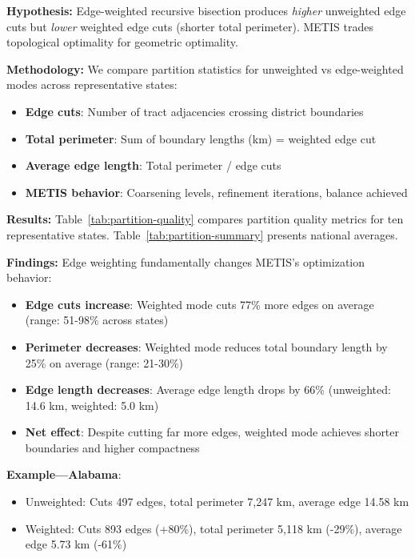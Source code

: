 \textbf{Hypothesis:} Edge-weighted recursive bisection produces \textit{higher} unweighted edge cuts but \textit{lower} weighted edge cuts (shorter total perimeter). METIS trades topological optimality for geometric optimality.

\textbf{Methodology:} We compare partition statistics for unweighted vs edge-weighted modes across representative states:
\begin{itemize}
    \item \textbf{Edge cuts}: Number of tract adjacencies crossing district boundaries
    \item \textbf{Total perimeter}: Sum of boundary lengths (km) = weighted edge cut
    \item \textbf{Average edge length}: Total perimeter / edge cuts
    \item \textbf{METIS behavior}: Coarsening levels, refinement iterations, balance achieved
\end{itemize}

\textbf{Results:} Table~\ref{tab:partition-quality} compares partition quality metrics for ten representative states. Table~\ref{tab:partition-summary} presents national averages.




\textbf{Findings:} Edge weighting fundamentally changes METIS's optimization behavior:
\begin{itemize}
    \item \textbf{Edge cuts increase}: Weighted mode cuts 77\% more edges on average (range: 51-98\% across states)
    \item \textbf{Perimeter decreases}: Weighted mode reduces total boundary length by 25\% on average (range: 21-30\%)
    \item \textbf{Edge length decreases}: Average edge length drops by 66\% (unweighted: 14.6 km, weighted: 5.0 km)
    \item \textbf{Net effect}: Despite cutting far more edges, weighted mode achieves shorter boundaries and higher compactness
\end{itemize}

\textbf{Example—Alabama}:
\begin{itemize}
    \item Unweighted: Cuts 497 edges, total perimeter 7,247 km, average edge 14.58 km
    \item Weighted: Cuts 893 edges (+80\%), total perimeter 5,118 km (-29\%), average edge 5.73 km (-61\%)
\end{itemize}

